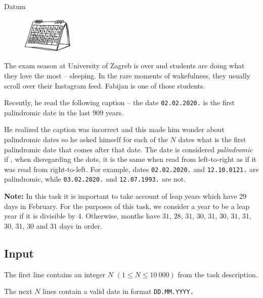 \begin{statement}[
  problempoints=50,
  timelimit=1 second,
  memorylimit=512 MiB,
]{Datum}

\setlength\intextsep{-0.1cm}
\begin{figure}
\centering
\includegraphics[width=0.22\textwidth]{img/datum.png}
\end{figure}

The exam season at University of Zagreb is over and students are doing what
they love the most -- sleeping. In the rare moments of wakefulness, they usually
scroll over their Instagram feed. Fabijan is one of those students.

Recently, he read the following caption -- the date \texttt{02.02.2020.} is
the first palindromic date in the last $909$ years.

He realized the caption was incorrect and this made him wonder about
palindromic dates so he asked himself for each of the $N$ dates what is the
first palindromic date that comes after that date.  The date is considered
\textit{palindromic} if
  , when disregarding the dots, it is the same when read
from left-to-right as if it was read from right-to-left.  For example, dates
\texttt{02.02.2020.} and \texttt{12.10.0121.} are palindromic, while
\texttt{03.02.2020.} and \texttt{12.07.1993.} are not.

\textbf{Note:} In this task it is important to take account of leap years
which have $29$ days in February. For the purposes of this task, we consider
a year to be a leap year if it is divisible by $4$. Otherwise, months have
$31$, $28$, $31$, $30$, $31$, $30$, $31$, $31$, $30$, $31$, $30$ and $31$ days
in order.

\subsection*{Input}
The first line contains an integer $N$ $(1 \le N \le 10\ 000)$ from the task
description.

The next $N$ lines contain a valid date in format \texttt{DD.MM.YYYY.}


\end{statement}
